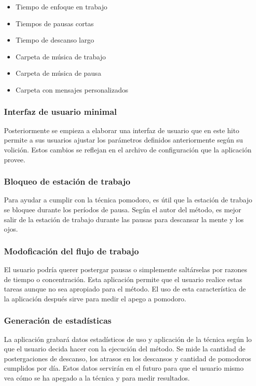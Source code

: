 \documentclass[12pt,letterpaper]{report}
\providecommand{\tightlist}{%
  \setlength{\itemsep}{0pt}\setlength{\parskip}{0pt}}
\begin{document}
\begin{itemize}\tightlist{}
  \item Tiempo de enfoque en trabajo
  \item Tiempos de pausas cortas
  \item Tiempo de descanso largo
  \item Carpeta de música de trabajo
  \item Carpeta de música de pausa
  \item Carpeta con mensajes personalizados
\end{itemize}

\subsubsection{Interfaz de usuario minimal}

Posteriormente se empieza a elaborar una interfaz de usuario que en este hito permite a sus usuarios ajustar los
parámetros definidos anteriormente según su volición. Estos cambios se reflejan en el archivo de configuración que la
aplicación provee.

\subsubsection{Bloqueo de estación de trabajo}

Para ayudar a cumplir con la técnica pomodoro, es útil que la estación de trabajo se bloquee durante los períodos de
pausa. Según el autor del método, es mejor salir de la estación de trabajo durante las pausas para descansar la mente y
los ojos.

\subsubsection{Modoficación del flujo de trabajo}

El usuario podría querer postergar pausas o simplemente saltárselas por razones de tiempo o concentración. Esta
aplicación permite que el usuario realice estas tareas aunque no sea apropiado para el método. El uso de esta
característica de la aplicación después sirve para medir el apego a pomodoro.

\subsubsection{Generación de estadísticas}

La aplicación grabará datos estadísticos de uso y aplicación de la técnica según lo que el usuario decida hacer con la
ejecución del método. Se mide la cantidad de postergaciones de descanso, los atrasos en los descansos y cantidad de
pomodoros cumplidos por día. Estos datos servirán en el futuro para que el usuario mismo vea cómo se ha apegado a la
técnica y para medir resultados.
\end{document}
